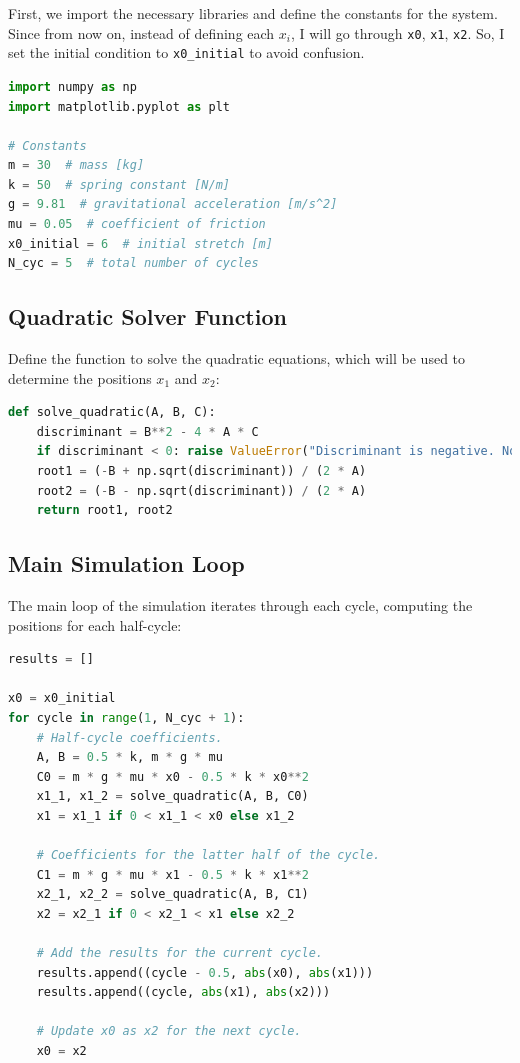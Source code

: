 \documentclass[12pt, a4paper, oneside]{report}
\begin{document}
First, we import the necessary libraries and define the constants for the system. Since from now on, instead of defining each \(x_i\), I will go through \texttt{x0}, \texttt{x1}, \texttt{x2}. So, I set the initial condition to \texttt{x0\_initial} to avoid confusion.
\begin{lstlisting}[language=Python, caption={Importing libraries and defining constants}]
import numpy as np
import matplotlib.pyplot as plt

# Constants
m = 30  # mass [kg]
k = 50  # spring constant [N/m]
g = 9.81  # gravitational acceleration [m/s^2]
mu = 0.05  # coefficient of friction
x0_initial = 6  # initial stretch [m]
N_cyc = 5  # total number of cycles
\end{lstlisting}

\subsection*{Quadratic Solver Function}

Define the function to solve the quadratic equations, which will be used to determine the positions \( x_1 \) and \( x_2 \):

\begin{lstlisting}[language=Python, caption={Defining the quadratic solver function}]
def solve_quadratic(A, B, C):
    discriminant = B**2 - 4 * A * C
    if discriminant < 0: raise ValueError("Discriminant is negative. No real roots.")
    root1 = (-B + np.sqrt(discriminant)) / (2 * A)
    root2 = (-B - np.sqrt(discriminant)) / (2 * A)
    return root1, root2
\end{lstlisting}

\subsection*{Main Simulation Loop}

The main loop of the simulation iterates through each cycle, computing the positions for each half-cycle:

\begin{lstlisting}[language=Python, caption={Main simulation loop}]
results = []

x0 = x0_initial
for cycle in range(1, N_cyc + 1):
    # Half-cycle coefficients.
    A, B = 0.5 * k, m * g * mu
    C0 = m * g * mu * x0 - 0.5 * k * x0**2
    x1_1, x1_2 = solve_quadratic(A, B, C0)
    x1 = x1_1 if 0 < x1_1 < x0 else x1_2

    # Coefficients for the latter half of the cycle.
    C1 = m * g * mu * x1 - 0.5 * k * x1**2
    x2_1, x2_2 = solve_quadratic(A, B, C1)
    x2 = x2_1 if 0 < x2_1 < x1 else x2_2

    # Add the results for the current cycle.
    results.append((cycle - 0.5, abs(x0), abs(x1)))
    results.append((cycle, abs(x1), abs(x2)))

    # Update x0 as x2 for the next cycle.
    x0 = x2
\end{lstlisting}
\end{document}
